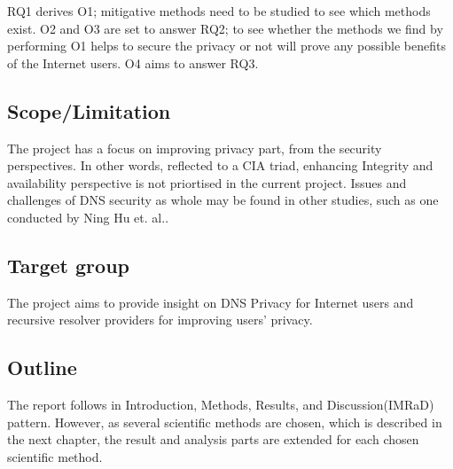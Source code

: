\documentclass[a4paper,12pt]{article}
\begin{document}
RQ1 derives O1; mitigative methods need to be studied to see which methods exist.
O2 and O3 are set to answer RQ2; to see whether the methods we find by performing O1 helps to secure the privacy or not will prove any possible benefits of the Internet users. O4 aims to answer RQ3.
\subsection{Scope/Limitation}
The project has a focus on improving privacy part, from the security perspectives. In other words, reflected to a CIA triad, enhancing Integrity and availability perspective is not priortised in the current project. Issues and challenges of DNS security as whole may be found in other studies, such as one conducted by Ning Hu et. al.\cite{ning2017dnssecurity}. 


\subsection{Target group}
The project aims to provide insight on DNS Privacy for Internet users and recursive resolver providers for improving users' privacy.

\subsection{Outline}
The report follows in Introduction, Methods, Results, and Discussion(IMRaD) pattern. However, as several scientific methods are chosen, which is described in the next chapter, the result and analysis parts are extended for each chosen scientific method. 

\newpage
\
\end{document}
